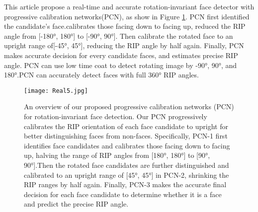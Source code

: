 \documentclass{article}
\begin{document}
\par This article propose a real-time and accurate rotation-invariant face detector with progressive calibration networks(PCN), as show in Figure \ref{fig:2}. PCN first identified the candidate's face.calibrates those facing down to facing up, reduced the RIP angle from [\ang{-180}, \ang{180}] to [\ang{-90}, \ang{90}]. Then calibrate the rotated face to an upright range of[\ang{-45}, \ang{45}], reducing the RIP angle by half again. Finally, PCN makes accurate decision for every candidate faces, and estimates precise RIP angle. PCN can use low time coat to detect rotating image by \ang{-90}, \ang{90}, and \ang{180}.PCN can accurately detect faces with full \ang{360} RIP angles.
\begin{figure}[H]
            \centering
            \texttt{[image: Real5.jpg]}
            \caption{An overview of our proposed progressive calibration networks (PCN) for rotation-invariant face detection. Our PCN progressively
            calibrates the RIP orientation of each face candidate to upright for better distinguishing faces from non-faces. Specifically, PCN-1 first identifies face candidates and calibrates those facing down to facing up, halving the range of RIP angles from [\ang{180}, \ang{180}] to [\ang{90}, \ang{90}].Then the rotated face candidates are further distinguished and calibrated to an upright range of [\ang{45}, \ang{45}] in PCN-2, shrinking the RIP ranges by half again. Finally, PCN-3 makes the accurate final decision for each face candidate to determine whether it is a face and predict the precise RIP angle.}
            \label{fig:2}
\end{figure}

\end{document}
